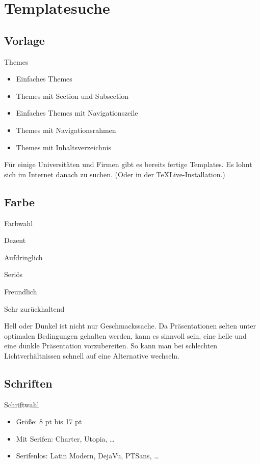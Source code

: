 \section{Templatesuche}
\subsection{Vorlage}
\begin{frame}[label=theme]{Themes}
   \begin{itemize}[<*>]
  \item
    Einfaches Themes
  \item
    Themes mit Section und Subsection
  \item
    Einfaches Themes mit Navigationszeile
  \item
    Themes mit Navigationsrahmen
  \item
    Themes mit Inhaltsverzeichnis
  \end{itemize}
\end{frame}

Für einige Universitäten und Firmen gibt es bereits fertige Templates.
Es lohnt sich im Internet danach zu suchen. (Oder in der TeXLive-Installation.)

\subsection{Farbe}
\begin{frame}[label=farbe]{Farbwahl}
   \begin{description}[<*>]
  \item[Spruce]
    Dezent
  \item[Albatross]
    Aufdringlich
  \item[Beetle]
    Seriös
  \item[Crane]
    Freundlich
  \item[Dove]
    Sehr zurückhaltend
  \end{description}
\end{frame}

Hell oder Dunkel ist nicht nur Geschmackssache.
Da Präsentationen selten unter optimalen Bedingungen gehalten werden, 
kann es sinnvoll sein, eine helle und eine dunkle Präsentation vorzubereiten.
So kann man bei schlechten Lichtverhältnissen schnell auf eine Alternative wechseln.

\subsection{Schriften}
\begin{frame}[label=schrift]{Schriftwahl}
   \begin{itemize}[<*>]
  \item
    Größe: 8 pt bis 17 pt
  \item
    Mit Serifen: Charter, Utopia,  \dots
  \item
    Serifenlos: Latin Modern, DejaVu, PTSans, \dots
  \end{itemize}
\end{frame}

